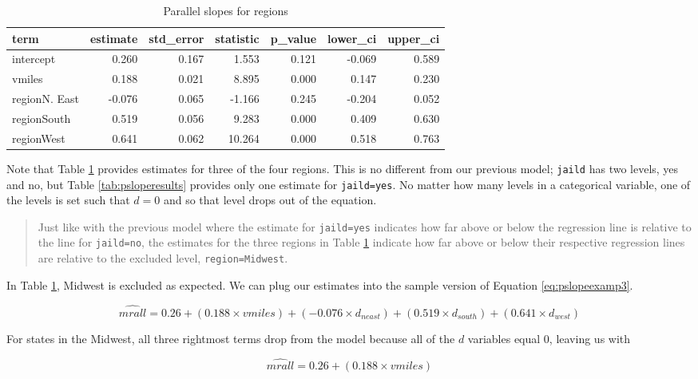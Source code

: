 \documentclass[
]{book}
\begin{document}
\begin{table}

\caption{\label{tab:psloperesults2}Parallel slopes for regions}
\centering
\begin{tabular}[t]{l|r|r|r|r|r|r}
\hline
term & estimate & std\_error & statistic & p\_value & lower\_ci & upper\_ci\\
\hline
intercept & 0.260 & 0.167 & 1.553 & 0.121 & -0.069 & 0.589\\
\hline
vmiles & 0.188 & 0.021 & 8.895 & 0.000 & 0.147 & 0.230\\
\hline
regionN. East & -0.076 & 0.065 & -1.166 & 0.245 & -0.204 & 0.052\\
\hline
regionSouth & 0.519 & 0.056 & 9.283 & 0.000 & 0.409 & 0.630\\
\hline
regionWest & 0.641 & 0.062 & 10.264 & 0.000 & 0.518 & 0.763\\
\hline
\end{tabular}
\end{table}

Note that Table \ref{tab:psloperesults2} provides estimates for three of the four regions. This is no different from our previous model; \texttt{jaild} has two levels, yes and no, but Table \ref{tab:psloperesults} provides only one estimate for \texttt{jaild=yes}. No matter how many levels in a categorical variable, one of the levels is set such that \(d=0\) and so that level drops out of the equation.

\begin{quote}
Just like with the previous model where the estimate for \texttt{jaild=yes} indicates how far above or below the regression line is relative to the line for \texttt{jaild=no}, the estimates for the three regions in Table \ref{tab:psloperesults2} indicate how far above or below their respective regression lines are relative to the excluded level, \texttt{region=Midwest}.
\end{quote}

In Table \ref{tab:psloperesults2}, Midwest is excluded as expected. We can plug our estimates into the sample version of Equation \eqref{eq:pslopeexamp3}.

\[\hat{mrall} = 0.26 + (0.188 \times vmiles) + (-0.076 \times d_{neast}) + (0.519 \times d_{south}) + (0.641 \times d_{west})\]

For states in the Midwest, all three rightmost terms drop from the model because all of the \(d\) variables equal 0, leaving us with

\[\hat{mrall} = 0.26 + (0.188 \times vmiles)\]
\end{document}
